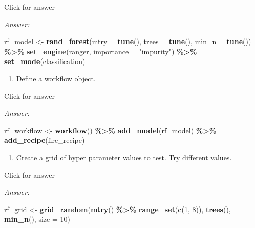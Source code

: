 \documentclass[
]{book}
\newenvironment{Shaded}{\begin{snugshade}}{\end{snugshade}}
\newcommand{\AttributeTok}[1]{\textcolor[rgb]{0.13,0.29,0.53}{#1}}
\newcommand{\DecValTok}[1]{\textcolor[rgb]{0.00,0.00,0.81}{#1}}
\newcommand{\FunctionTok}[1]{\textcolor[rgb]{0.13,0.29,0.53}{\textbf{#1}}}
\newcommand{\NormalTok}[1]{#1}
\newcommand{\OtherTok}[1]{\textcolor[rgb]{0.56,0.35,0.01}{#1}}
\newcommand{\SpecialCharTok}[1]{\textcolor[rgb]{0.81,0.36,0.00}{\textbf{#1}}}
\newcommand{\StringTok}[1]{\textcolor[rgb]{0.31,0.60,0.02}{#1}}
\providecommand{\tightlist}{%
  \setlength{\itemsep}{0pt}\setlength{\parskip}{0pt}}
\begin{document}
Click for answer

\emph{Answer:}

\begin{Shaded}
\begin{Highlighting}[]
\NormalTok{rf\_model }\OtherTok{\textless{}{-}} \FunctionTok{rand\_forest}\NormalTok{(}\AttributeTok{mtry =} \FunctionTok{tune}\NormalTok{(),}
                        \AttributeTok{trees =} \FunctionTok{tune}\NormalTok{(),}
                        \AttributeTok{min\_n =} \FunctionTok{tune}\NormalTok{()) }\SpecialCharTok{\%\textgreater{}\%} 
            \FunctionTok{set\_engine}\NormalTok{(}\StringTok{\textquotesingle{}ranger\textquotesingle{}}\NormalTok{, }\AttributeTok{importance =} \StringTok{"impurity"}\NormalTok{) }\SpecialCharTok{\%\textgreater{}\%} 
            \FunctionTok{set\_mode}\NormalTok{(}\StringTok{\textquotesingle{}classification\textquotesingle{}}\NormalTok{)}
\end{Highlighting}
\end{Shaded}

\begin{enumerate}
\def\labelenumi{\alph{enumi}.}
\setcounter{enumi}{1}
\tightlist
\item
  Define a workflow object.
\end{enumerate}

Click for answer

\emph{Answer:}

\begin{Shaded}
\begin{Highlighting}[]
\NormalTok{rf\_workflow }\OtherTok{\textless{}{-}} \FunctionTok{workflow}\NormalTok{() }\SpecialCharTok{\%\textgreater{}\%} 
               \FunctionTok{add\_model}\NormalTok{(rf\_model) }\SpecialCharTok{\%\textgreater{}\%} 
               \FunctionTok{add\_recipe}\NormalTok{(fire\_recipe)}
\end{Highlighting}
\end{Shaded}

\begin{enumerate}
\def\labelenumi{\alph{enumi}.}
\setcounter{enumi}{2}
\tightlist
\item
  Create a grid of hyper parameter values to test. Try different values.
\end{enumerate}

Click for answer

\emph{Answer:}

\begin{Shaded}
\begin{Highlighting}[]
\NormalTok{rf\_grid }\OtherTok{\textless{}{-}} \FunctionTok{grid\_random}\NormalTok{(}\FunctionTok{mtry}\NormalTok{() }\SpecialCharTok{\%\textgreater{}\%} \FunctionTok{range\_set}\NormalTok{(}\FunctionTok{c}\NormalTok{(}\DecValTok{1}\NormalTok{, }\DecValTok{8}\NormalTok{)),}
                       \FunctionTok{trees}\NormalTok{(),}
                       \FunctionTok{min\_n}\NormalTok{(),}
                       \AttributeTok{size =} \DecValTok{10}\NormalTok{)}
\end{Highlighting}
\end{Shaded}
\end{document}
